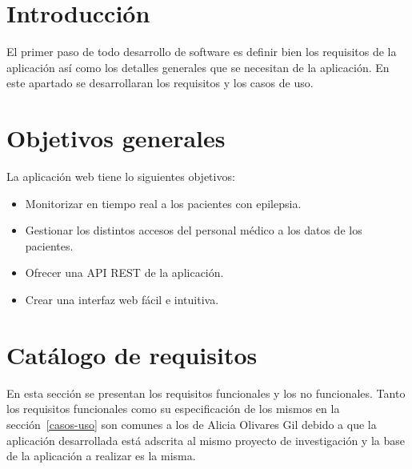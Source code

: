 
\section{Introducción}

El primer paso de todo desarrollo de software es definir bien los requisitos de la aplicación así como los detalles generales que se necesitan de la aplicación. En este apartado se desarrollaran los requisitos y los casos de uso.

\section{Objetivos generales}

La aplicación web tiene lo siguientes objetivos:
\begin{itemize}
	\tightlist
	\item
	Monitorizar en tiempo real a los pacientes con epilepsia.
	\item 
	Gestionar los distintos accesos del personal médico a los datos de los pacientes.
	\item 
	Ofrecer una API REST de la aplicación.
	\item 
	Crear una interfaz web fácil e intuitiva.
\end{itemize}

\section{Catálogo de requisitos}
En esta sección se presentan los requisitos funcionales y los no funcionales. Tanto los requisitos funcionales como su especificación de los mismos en la sección~\ref{casos-uso} son comunes a los de Alicia Olivares Gil debido a que la aplicación desarrollada está adscrita al mismo proyecto de investigación y la base de la aplicación a realizar es la misma.
